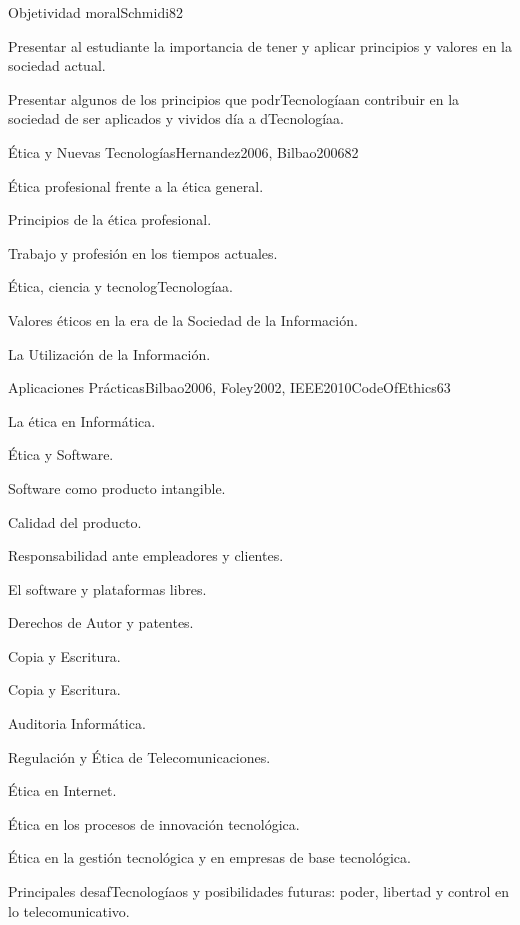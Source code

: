 \begin{syllabus}
\begin{unit}{Objetividad moral}{Schmidi}{8}{2}
\begin{learningoutcomes}
	\item Presentar al estudiante la importancia de tener y aplicar principios y valores en la sociedad actual.
	\item Presentar algunos de los principios que podrTecnologíaan contribuir en la sociedad de ser aplicados y vividos día a dTecnologíaa.
\end{learningoutcomes}
\end{unit}

\begin{unit}{Ética y Nuevas Tecnologías}{Hernandez2006, Bilbao2006}{8}{2}
\begin{topics}
      \item Ética profesional frente a la ética general.
      \item Principios de la ética profesional.
      \item Trabajo y profesión en los tiempos actuales.
      \item Ética, ciencia y tecnologTecnologíaa.
      \item Valores éticos en la era de la Sociedad de la Información.
      \item La Utilización de la Información.
\end{topics}
\end{unit}

\begin{unit}{Aplicaciones Prácticas}{Bilbao2006, Foley2002, IEEE2010CodeOfEthics}{6}{3}
\begin{topics}
      \item La ética en Informática.
      \item Ética y Software.
      \item Software como producto intangible.
      \item Calidad del producto.
      \item Responsabilidad ante empleadores y clientes.
      \item El software y plataformas libres.
      \item Derechos de Autor y patentes.
      \item Copia y Escritura.
      \item Copia y Escritura.
      \item Auditoria Informática.
      \item Regulación y Ética de Telecomunicaciones.
      \item Ética en Internet.
      \item Ética en los procesos de innovación tecnológica.
      \item Ética en la gestión tecnológica y en empresas de base tecnológica.
      \item Principales desafTecnologíaos y posibilidades futuras: poder, libertad y control en lo telecomunicativo.
\end{topics}
\end{unit}



\begin{coursebibliography}
\end{coursebibliography}

\end{syllabus}
